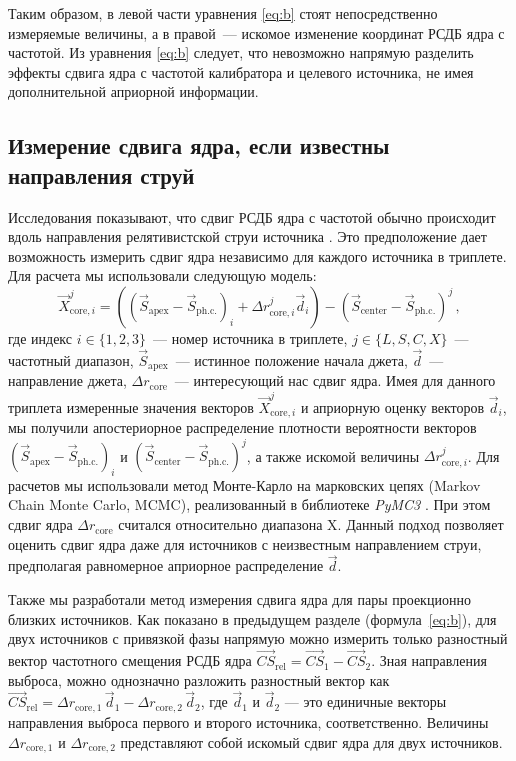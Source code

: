 Таким образом, в левой части уравнения \eqref{eq:b} стоят непосредственно измеряемые величины, а в
правой~--- искомое изменение координат РСДБ ядра с частотой. Из уравнения \eqref{eq:b} следует, что
невозможно напрямую разделить эффекты сдвига ядра с частотой калибратора и целевого источника, не
имея дополнительной априорной информации.


\subsection{Измерение сдвига ядра, если известны направления струй}
\label{s:method_astrometry}
Исследования показывают, что сдвиг РСДБ ядра с частотой обычно происходит вдоль направления
релятивистской струи источника \cite{Pushkarev_2012}. Это предположение дает возможность
измерить сдвиг ядра независимо для каждого источника в триплете. Для расчета мы использовали
следующую модель:
$$
\vec{X}_{\mathrm{core}, i}^{j} = ((\vec{S}_\mathrm{apex} - \vec{S}_\mathrm{ph.c.})_i +
\Delta r_{\mathrm{core},i}^{j} \vec{d}_i) - (\vec{S}_\mathrm{center} -
\vec{S}_\mathrm{ph.c.})^j \,,
$$
где индекс $i \in \{1,2,3\}$~--- номер источника в триплете, $j \in \{L,S,C,X\}$~---
частотный диапазон, $\vec{S}_\mathrm{apex}$~--- истинное положение начала джета, $\vec{d}$~---
направление джета, $\Delta r_\mathrm{core}$~--- интересующий нас сдвиг ядра. Имея для данного
триплета измеренные значения векторов $\vec{X}_{\mathrm{core}, i}^{j}$ и априорную оценку векторов
$\vec{d}_i$, мы получили апостериорное распределение плотности вероятности векторов
$(\vec{S}_\mathrm{apex} - \vec{S}_\mathrm{ph.c.})_i$ и $(\vec{S}_\mathrm{center} -
\vec{S}_\mathrm{ph.c.})^j$, а также искомой величины $\Delta r_{\mathrm{core},i}^{j}$. Для
расчетов мы использовали метод Монте-Карло на марковских цепях (Markov Chain Monte Carlo, MCMC),
реализованный в библиотеке \emph{PyMC3} \cite{Salvatier_2016}. При этом сдвиг ядра $\Delta
r_{\mathrm{core}}$ считался относительно диапазона X. Данный подход позволяет оценить сдвиг ядра
даже для источников с неизвестным направлением струи, предполагая равномерное априорное
распределение $\vec{d}$.

Также мы разработали метод измерения сдвига ядра для пары проекционно близких источников. Как
показано в предыдущем разделе (формула~\ref{eq:b}), для двух источников с привязкой фазы напрямую
можно измерить только
разностный вектор частотного смещения РСДБ ядра $\vec{CS}_{\mathrm{rel}} = \vec{CS}_1 -
\vec{CS}_2$. Зная направления выброса, можно однозначно разложить разностный вектор как
$\vec{CS}_{\mathrm{rel}} = \Delta r_{\mathrm{core},1} \, \vec{d}_1 - \Delta
r_{\mathrm{core},2} \, \vec{d}_2$, где $\vec{d}_1$ и $\vec{d}_2$ --- это единичные векторы
направления выброса первого и второго источника, соответственно. Величины $\Delta
r_{\mathrm{core},1}$ и $\Delta r_{\mathrm{core},2}$ представляют собой искомый сдвиг ядра для двух
источников.

